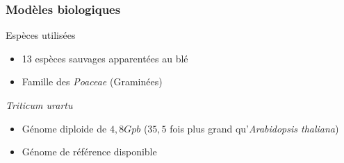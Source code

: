 \begin{frame}

    \frametitle{Modèles biologiques}
    \begin{block}{Espèces utilisées}
        \begin{itemize}
            \item 13 espèces sauvages apparentées au blé 
            \item Famille des \textit{Poaceae} (Graminées)
        \end{itemize}
    \end{block}
    \vspace{0.25cm}
    \begin{block}{\textit{Triticum urartu}}
        \begin{itemize}

            
            \item Génome diploide de $4,8Gpb$  ($35,5$ fois plus
grand qu’\textit{Arabidopsis thaliana})
            \item Génome de référence disponible
        \end{itemize}
    \end{block}
\end{frame}

